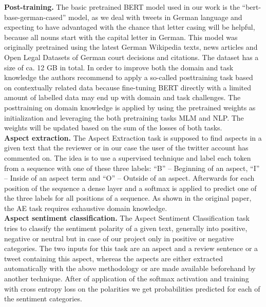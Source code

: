 \textbf{Post-training.}
The basic pretrained BERT model used in our work is the “bert-base-german-cased” 
model, as we deal with tweets in German language and expecting to have 
advantaged with the chance that letter casing will be helpful, because all nouns 
start with the capital letter in German. This model was originally pretrained 
using the latest German Wikipedia texts, news articles and Open Legal Datasets 
of German court decisions and citations. The dataset has a size of ca. 12 GB in 
total. 
In order to improve both the domain and task knowledge the authors recommend to 
apply a so-called posttraining task based on contextually related data because 
fine-tuning BERT directly with a limited amount of labelled data may end up with 
domain and task challenges. The posttraining on domain knowledge is applied by 
using the pretrained weights as initialization and leveraging the both 
pretraining tasks MLM and NLP. The weights will be updated based on the sum of 
the losses of both tasks. 
\\

\textbf{Aspect extraction.}
The Aspect Extraction task is supposed to find aspects in a given text that the 
reviewer or in our case the user of the twitter account has commented on. The 
idea is to use a supervised technique and label each token from a sequence with 
one of these three labels: “B” – Beginning of an aspect, “I” – Inside of an 
aspect term and “O” – Outside of an aspect. Afterwards for each position of the 
sequence a dense layer and a softmax is applied to predict one of the three 
labels for all positions of a sequence. As shown in the original paper, the AE 
task requires exhaustive domain knowledge.
\\

\textbf{Aspect sentiment classification.}
The Aspect Sentiment Classification task tries to classify the sentiment 
polarity of a given text, generally into positive, negative or neutral but in 
case of our project only in positive or negative categories. The two inputs for 
this task are an aspect and a review sentence or a tweet containing this aspect, 
whereas the aspects are either extracted automatically with the above 
methodology or are made available beforehand by another technique. After of 
application of the softmax activation and training with cross entropy loss on 
the polarities we get probabilities predicted for each of the sentiment 
categories. 
\\

